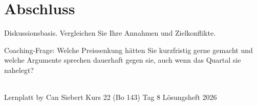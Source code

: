 \documentclass[11pt,a4paper,oneside]{article}
\begin{document}
\clearpage

\section*{Abschluss}
\thispagestyle{plain}

\noindent Diskussionsbasis. Vergleichen Sie Ihre Annahmen und Zielkonflikte.

\medskip
\begin{infobox}
Coaching-Frage: Welche Preissenkung hätten Sie kurzfristig gerne gemacht \textendash{} und welche Argumente sprechen dauerhaft gegen sie, auch wenn das Quartal sie nahelegt?
\end{infobox}

\vspace{1cm}
\noindent{\color{lpAccent}\rule{\linewidth}{0.6pt}}\\[4pt]
{\footnotesize\sffamily\color{lpGray}Lernplatt \textperiodcentered{} by Can Siebert \textperiodcentered{} Kurs 22 (Bo 143) \textperiodcentered{} Tag 8 \textperiodcentered{} Lösungsheft \textperiodcentered{} \textcopyright{} 2026}
\end{document}
